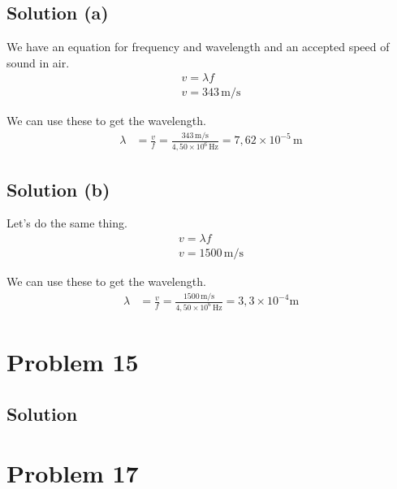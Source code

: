 \documentclass[12pt]{article}
\newcommand{\E}[1]{\times 10^{#1}}
\begin{document}
        \subsection{Solution (a)}
            We have an equation for frequency and wavelength and an accepted speed of sound in air.
            \begin{gather}
                v   =   \lambda f\\
                v   =   343\,\unit{\meter/\second}
            \end{gather}

            We can use these to get the wavelength.
            \begin{align}
                \lambda &=  \frac{v}{f}
                    =   \frac{343\,\unit{\meter/\second}}{4,50\E{6}\,\unit{\hertz}}
                    =   \boxed{7,62\E{-5}\,\unit{\meter}}
            \end{align}

        \subsection{Solution (b)}
            Let's do the same thing.
            \begin{gather}
                v   =   \lambda f\\
                v   =   1500\,\unit{\meter/\second}
            \end{gather}

            We can use these to get the wavelength.
            \begin{align}
                \lambda &=  \frac{v}{f}
                    =   \frac{1500\,\unit{\meter/\second}}{4,50\E{6}\,\unit{\hertz}}
                    =   \boxed{3,3\E{-4}\unit{\meter}}
            \end{align}

    \pagebreak
    \section{Problem 15}

        \subsection{Solution}

    \pagebreak
    \section{Problem 17}
\end{document}
